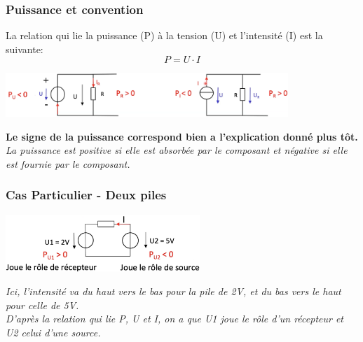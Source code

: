 \subsubsection{Puissance et convention}
La relation qui lie la puissance (P) à la tension (U) et l'intensité (I) est la suivante:
\begin{equation}
    P = U \cdot I
\end{equation}
\begin{center}
    \includegraphics[width=0.80\textwidth]{chapters/chapter1/images/puissance.png}
\end{center}
\textbf{Le signe de la puissance correspond bien a l'explication donné plus tôt.} \\
\textit{La puissance est positive si elle est absorbée par le composant et négative si elle est fournie par le composant.} \\
\subsubsection{Cas Particulier - Deux piles}
\begin{center}
    \includegraphics[width=0.55\textwidth]{chapters/chapter1/images/attention.png}
\end{center}
\textit{Ici, l'intensité va du haut vers le bas pour la pile de 2V, et du bas vers le haut pour celle de 5V.} \\
\textit{D'après la relation qui lie P, U et I, on a que U1 joue le rôle d'un récepteur et U2 celui d'une source.}

